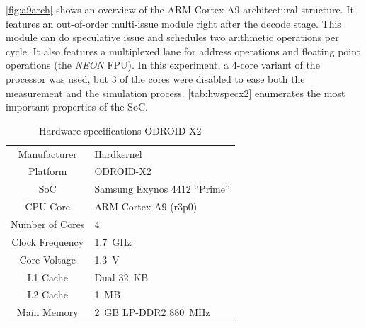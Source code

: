 \autoref{fig:a9arch} shows an overview of the ARM Cortex-A9 architectural
structure. It features an out-of-order multi-issue module right after the decode
stage. This module can do speculative issue and schedules two arithmetic
operations per cycle. It also features a multiplexed lane for address operations
and floating point operations (the \emph{NEON} FPU). In this experiment, a
4-core variant of the processor was used, but 3 of the cores were disabled to
ease both the measurement and the simulation process. \autoref{tab:hwspecx2}
enumerates the most important properties of the SoC.


\begin{table}
    \centering
    \begin{tabular}{|c|l|}
        \rowcolor{gray!25}
        \hline
        Manufacturer   & Hardkernel \\
        Platform       & ODROID-X2 \\
        SoC            & Samsung Exynos 4412 ``Prime'' \\
        CPU Core       & ARM Cortex-A9 (r3p0) \\
        Number of Cores& 4 \\
        Clock Frequency& 1.7~GHz \\
        Core Voltage   & 1.3~V \\
        L1 Cache       & Dual 32~KB \\
        L2 Cache       & 1~MB \\
        Main Memory    & 2~GB LP-DDR2 880~MHz \\
        \hline
    \end{tabular}
    \caption{Hardware specifications ODROID-X2}
    \label{tab:hwspecx2}
\end{table}


